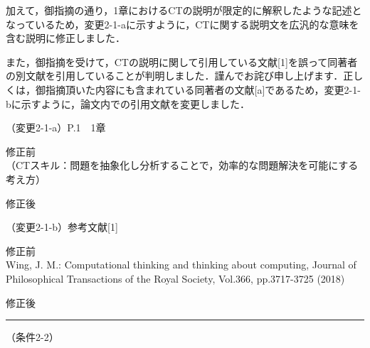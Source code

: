 \documentclass{jarticle} %
\def\subsection#1{ \vspace{1pc} {\gt #1} }
\def\nextans{ \vspace{2pc} \hrule }
\begin{document}
加えて，御指摘の通り，1章におけるCTの説明が限定的に解釈したような記述となっているため，変更2-1-aに示すように，CTに関する説明文を広汎的な意味を含む説明に修正しました．

また，御指摘を受けて，CTの説明に関して引用している文献[1]を誤って同著者の別文献を引用していることが判明しました．謹んでお詫び申し上げます．正しくは，御指摘頂いた内容にも含まれている同著者の文献[a]であるため，変更2-1-bに示すように，論文内での引用文献を変更しました．


\subsection{（変更2-1-a）P.1　1章}
\vspace{-0.3cm}
\begin{description}
\item 修正前\\
\phantom{　}
（CTスキル：問題を抽象化し分析することで，効率的な問題解決を可能にする考え方）
\vspace{-0.3cm}
\item 修正後\\
\phantom{　}
\textcolor{red}{}
\end{description}

\newpage
\subsection{（変更2-1-b）参考文献[1]}
\vspace{-0.3cm}
\begin{description}
\item 修正前\\
\phantom{　}
\noindent[1] Wing, J. M.: Computational thinking and thinking about computing, Journal of Philosophical Transactions of the Royal Society, Vol.366, pp.3717-3725 (2018)
\vspace{-0.3cm}
\item 修正後\\
\phantom{　}
\noindent\textcolor{red}{}
\end{description}


\nextans
\subsection{（条件2-2）}
\end{document}
